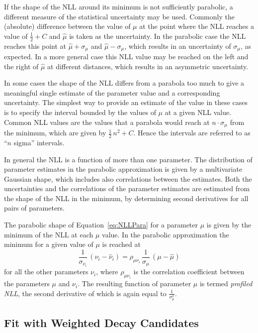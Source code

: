 If the shape of the NLL around its minimum is not sufficiently parabolic, a different measure of the statistical uncertainty may be used.
Commonly the (absolute) difference between the value of $\mu$ at the point where the NLL reaches a value of $\tfrac{1}{2}+C$ and
$\hat{\mu}$ is taken as the uncertainty. In the parabolic case the NLL reaches this point at $\hat{\mu}+\sigma_\mu$ and
$\hat{\mu}-\sigma_\mu$, which results in an uncertainty of $\sigma_\mu$, as expected. In a more general case this NLL value may be reached
on the left and the right of $\hat{\mu}$ at different distances, which results in an asymmetric uncertainty.

In some cases the shape of the NLL differs from a parabola too much to give a meaningful single estimate of the parameter value and a
corresponding uncertainty. The simplest way to provide an estimate of the value in these cases is to specify the interval bounded by the
values of $\mu$ at a given NLL value. Common NLL values are the values that a parabola would reach at $n\cdot\sigma_\mu$ from the minimum,
which are given by $\tfrac{1}{2}\,n^2+C$. Hence the intervals are referred to as ``$n$ sigma'' intervals.

In general the NLL is a function of more than one parameter. The distribution of parameter estimates in the parabolic approximation is
given by a multivariate Gaussian shape, which includes also correlations between the estimates. Both the uncertainties and the correlations
of the parameter estimates are estimated from the shape of the NLL in the minimum, by determining second derivatives for all pairs
of parameters.

The parabolic shape of Equation~\ref{eq:NLLPara} for a parameter $\mu$ is given by the minimum of the NLL at each $\mu$ value. In the
parabolic approximation the minimum for a given value of $\mu$ is reached at
\begin{equation}
  \frac{1}{\sigma_{\nu_i}}\, (\nu_i-\hat{\nu}_i)  = \rho_{\mu\nu_i}\, \frac{1}{\sigma_\mu}\, (\mu-\hat{\mu})
\end{equation}
for all the other parameters $\nu_i$, where $\rho_{\mu\nu_i}$ is the correlation coefficient between the parameters $\mu$ and $\nu_i$. The
resulting function of parameter $\mu$ is termed \emph{profiled NLL}, the second derivative of which is again equal to
$\frac{1}{\sigma_\mu^2}$.


\subsection{Fit with Weighted Decay Candidates}
\label{subsec:ana_fit_weights}

